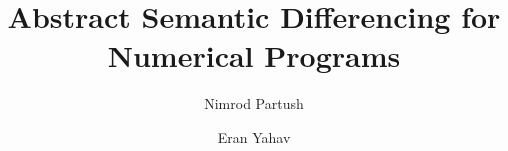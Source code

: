 \documentclass{llncs}
\begin{document}
\title{Abstract Semantic Differencing for Numerical Programs\vspace{-0.05in}}


\author{Nimrod Partush \and Eran Yahav}

\maketitle












%

\begin{spacing}{0.95}


\end{spacing}

\appendix

\end{document}
